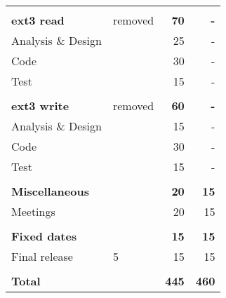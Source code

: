 \begin{longtable}{p{5cm}p{2cm}rr}
&&&\\
\textbf{ext3 read}							& removed								&	\textbf{70}								& \textbf{-}\\
Analysis \& Design							&												& 25												& -\\
Code														&												&	30												& -\\
Test														&												&	15												& -\\

&&&\\
\textbf{ext3 write}							& removed								&	\textbf{60}								& \textbf{-}\\
Analysis \& Design							&												& 15												& -\\
Code														&												&	30												& -\\
Test														&												&	15												& -\\

&&&\\
\textbf{Miscellaneous}					&												&	\textbf{20}								& \textbf{15}\\
Meetings												&												& 20												& 15\\

&&&\\
\textbf{Fixed dates}						&												&	\textbf{15}								& \textbf{15}\\
Final release										&	5											&	15												& 15\\

&&&\\
\hline
\textbf{Total}									&												& \textbf{445}							& \textbf{460}\\

\end{longtable}	